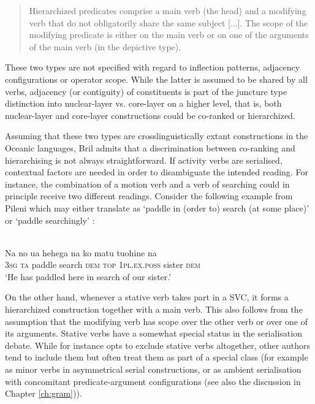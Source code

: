 \begin{quote}Hierarchized predicates comprise a main verb (the head) and a modifying verb that do not obligatorily share the same subject [...]. The scope of the modifying predicate is either on the main verb or on one of the arguments of the main verb (in the
depictive type). \citep[270]{bril2007nexus}\end{quote}

These two types are not specified with regard to inflection patterns, adjacency configurations or operator scope. While the latter is assumed to be shared by all verbs, adjacency (or contiguity) of constituents is part of the juncture type distinction into nuclear-layer vs. core-layer on a higher level, that is, both nuclear-layer and core-layer constructions could be co-ranked or hierarchized.

Assuming that these two types are crosslinguistically extant constructions in the Oceanic languages, Bril admits that a discrimination between co-ranking and hierarchising is not always straightforward. If activity verbs are serialised, contextual factors are needed in order to disambiguate the intended reading. For instance, the combination of a motion verb and a verb of searching could in principle receive two different readings. Consider the following example from Pileni which may either translate as `paddle in (order to) search (at some place)' or `paddle searchingly' \citep[271]{bril2007nexus}:

\ea \label{}
\\
\gll Na no ua hehega na ko matu tuohine na \\
\textsc{3}\textsc{sg} \textsc{ta} paddle search \textsc{dem} \textsc{top} \textsc{1}\textsc{pl}.\textsc{ex}.\textsc{poss} sister \textsc{dem} \\
\glft `He has paddled here in search of our sister.’\\ 
\z

On the other hand, whenever a stative verb takes part in a SVC, it forms a hierarchized construction together with a main verb. This also follows from the assumption that the modifying verb has scope over the other verb or over one of its arguments. Stative verbs have a somewhat special status in the serialisation debate. While for instance \citet{haspelmath2016serial} opts to exclude stative verbs altogether, other authors tend to include them but often treat them as part of a special class (for example as minor verbs in asymmetrical serial constructions, or as ambient serialisation with concomitant predicate-argument configurations (see also the discussion in Chapter \ref{ch:gram})). 

